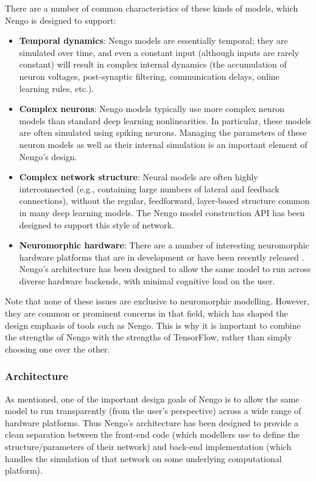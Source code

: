 \documentclass{article}
\begin{document}
There are a number of common characteristics of these kinds of models, which Nengo is designed to support:

\begin{itemize}
\item {\bf Temporal dynamics}: Nengo models are essentially temporal; they are simulated over time, and even a constant input (although inputs are rarely constant) will result in complex internal dynamics (the accumulation of neuron voltages, post-synaptic filtering, communication delays, online learning rules, etc.).
\item {\bf Complex neurons}: Nengo models typically use more complex neuron models than standard deep learning nonlinearities. In particular, these models are often simulated using spiking neurons.  Managing the parameters of these neuron models as well as their internal simulation is an important element of Nengo's design.
\item {\bf Complex network structure}: Neural models are often highly interconnected (e.g., containing large numbers of lateral and feedback connections), without the regular, feedforward, layer-based structure common in many deep learning models.  The Nengo model construction API has been designed to support this style of network.
\item {\bf Neuromorphic hardware}: There are a number of interesting neuromorphic hardware platforms that are in development or have been recently released \citep[e.g.,][]{Khan2008,Benjamin2014,Davies2018}.  Nengo's architecture has been designed to allow the same model to run across diverse hardware backends, with minimal cognitive load on the user.
\end{itemize}

Note that none of these issues are exclusive to neuromorphic modelling.  However, they are common or prominent concerns in that field, which has shaped the design emphasis of tools such as Nengo.  This is why it is important to combine the strengths of Nengo with the strengths of TensorFlow, rather than simply choosing one over the other.

\subsubsection{Architecture}

As mentioned, one of the important design goals of Nengo is to allow the same model to run transparently (from the user's perspective) across a wide range of hardware platforms.  Thus Nengo's architecture has been designed to provide a clean separation between the front-end code (which modellers use to define the structure/parameters of their network) and back-end implementation (which handles the simulation of that network on some underlying computational platform).  
\end{document}
